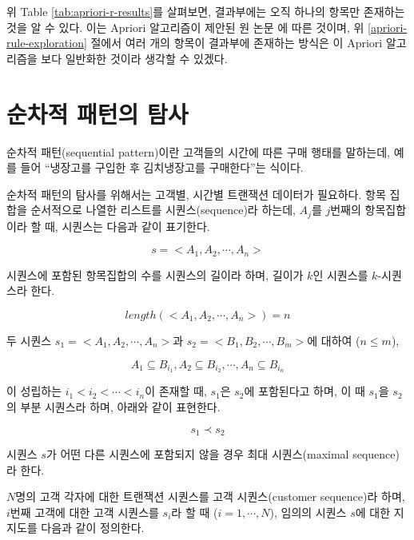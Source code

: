 \documentclass[
]{book}
\begin{document}
위 Table \ref{tab:apriori-r-results}를 살펴보면, 결과부에는 오직 하나의 항목만 존재하는 것을 알 수 있다. 이는 Apriori 알고리즘이 제안된 원 논문 \citep{agrawal1993mining}에 따른 것이며, 위 \ref{apriori-rule-exploration} 절에서 여러 개의 항목이 결과부에 존재하는 방식은 이 Apriori 알고리즘을 보다 일반화한 것이라 생각할 수 있겠다.

\hypertarget{association-sequential-pattern}{%
\section{순차적 패턴의 탐사}\label{association-sequential-pattern}}

순차적 패턴(sequential pattern)이란 고객들의 시간에 따른 구매 행태를 말하는데, 예를 들어 ``냉장고를 구입한 후 김치냉장고를 구매한다''는 식이다.

순차적 패턴의 탐사를 위해서는 고객별, 시간별 트랜잭션 데이터가 필요하다. 항목 집합을 순서적으로 나열한 리스트를 시퀀스(sequence)라 하는데, \(A_j\)를 \(j\)번째의 항목집합이라 할 때, 시퀀스는 다음과 같이 표기한다.

\begin{equation*}
s = < A_1, A_2, \cdots, A_n >
\end{equation*}

시퀀스에 포함된 항목집합의 수를 시퀀스의 길이라 하며, 길이가 \(k\)인 시퀀스를 \(k\)-시퀀스라 한다.

\begin{equation*}
length(< A_1, A_2, \cdots, A_n >) = n
\end{equation*}

두 시퀀스 \(s_1 = < A_1, A_2, \cdots, A_n >\)과 \(s_2 = < B_1, B_2, \cdots, B_m >\)에 대하여 (\(n \leq m\)),

\begin{equation*}
A_1 \subseteq B_{i_1}, A_2 \subseteq B_{i_2}, \cdots,  A_n \subseteq B_{i_n}
\end{equation*}

이 성립하는 \(i_1 < i_2 < \cdots < i_n\)이 존재할 때, \(s_1\)은 \(s_2\)에 포함된다고 하며, 이 때 \(s_1\)을 \(s_2\)의 부분 시퀀스라 하며, 아래와 같이 표현한다.

\begin{equation*}
s_1 \prec s_2
\end{equation*}

시퀀스 \(s\)가 어떤 다른 시퀀스에 포함되지 않을 경우 최대 시퀀스(maximal sequence)라 한다.

\(N\)명의 고객 각자에 대한 트랜잭션 시퀀스를 고객 시퀀스(customer sequence)라 하며, \(i\)번째 고객에 대한 고객 시퀀스를 \(s_i\)라 할 때 (\(i = 1, \cdots, N\)), 임의의 시퀀스 \(s\)에 대한 지지도를 다음과 같이 정의한다.
\end{document}
